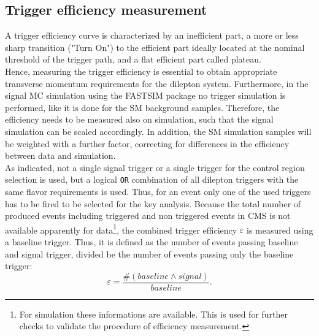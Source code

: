 \subsection{Trigger efficiency measurement}
A trigger efficiency curve is characterized by an inefficient part, a more or less sharp transition ("Turn On") to the efficient part ideally located at the nominal threshold of the trigger path, and a flat efficient part called plateau.\\
Hence, measuring the trigger efficiency is essential to obtain appropriate transverse momentum requirements for the dilepton system. Furthermore, in the signal MC simulation using the \textsc{FASTSIM} package no trigger simulation is performed, like it is done for the SM background samples. Therefore, the efficiency needs to be measured also on simulation, such that the signal simulation can be scaled accordingly. In addition, the SM simulation samples will be weighted with a further factor, correcting for differences in the efficiency between data and simulation.\\
As indicated, not a single signal trigger or a single trigger for the control region selection is used, but a logical \texttt{OR} combination of all dilepton triggers with the same flavor requirements is used. Thus, for an event only one of the used triggers has to be fired to be selected for the key analysis. Because the total number of produced events including triggered and non triggered events in CMS is not available apparently for data\footnote{For simulation these informations are available. This is used for further checks to validate the procedure of efficiency measurement.}, the combined trigger efficiency $\varepsilon$ is measured using a baseline trigger. Thus, it is defined as the number of events passing baseline and signal trigger, divided be the number of events passing only the baseline trigger:
\begin{equation}
 \varepsilon=\frac{\#(baseline \wedge signal)}{baseline}.
\end{equation}
